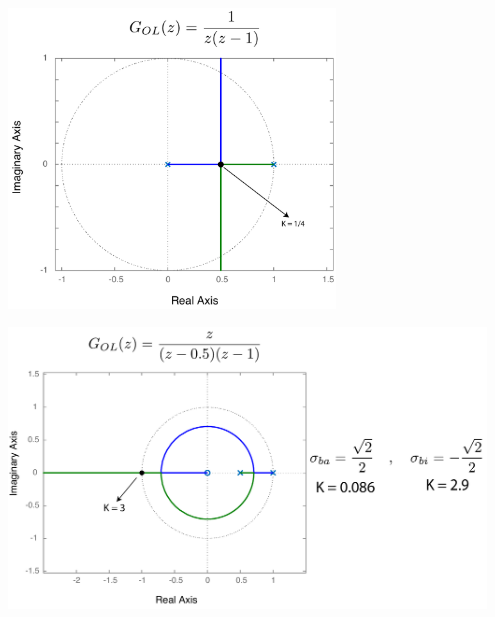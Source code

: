 \documentclass[twoside]{article}
\begin{document}
\begin{center}
\begin{minipage}[h]{\linewidth}
    \begin{center}
      \includegraphics[width=0.65\textwidth]{E3}
    \end{center}
\end{minipage}
    \end{center}

\begin{center}
\begin{minipage}[h]{\linewidth}
    \begin{center}
      \includegraphics[width=0.95\textwidth]{E4}
    \end{center}
\end{minipage}
    \end{center}
\end{document}
